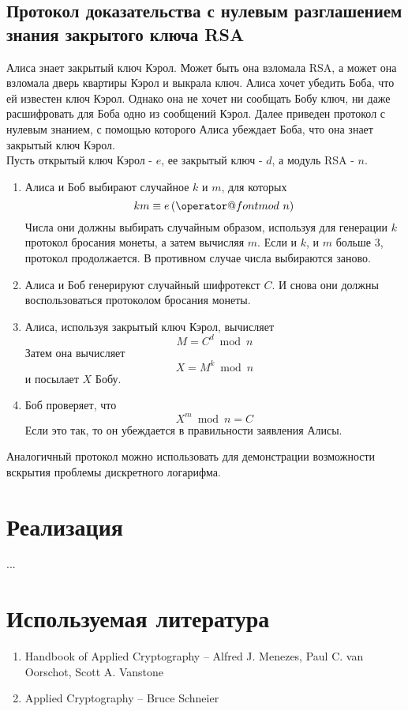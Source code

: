 \documentclass[12pt,a4paper]{report}
\makeatletter
\def\imod#1{\allowbreak\,({\operator@font mod}\ #1)}
\makeatother
\begin{document}
\section{Протокол доказательства с
нулевым разглашением знания закрытого ключа RSA}

Алиса знает закрытый ключ Кэрол. Может быть она взломала RSA, а
может она взломала дверь квартиры Кэрол и выкрала ключ. Алиса
хочет убедить Боба, что ей известен ключ Кэрол. Однако она не
хочет ни сообщать Бобу ключ, ни даже расшифровать для Боба одно
из сообщений Кэрол. Далее приведен протокол с нулевым знанием,
с помощью которого Алиса убеждает Боба, что она знает закрытый
ключ Кэрол.\\

Пусть открытый ключ Кэрол - $e$, ее закрытый ключ - $d$, а
модуль RSA - $n$.

\begin{enumerate}
\item Алиса и Боб выбирают случайное $k$ и $m$, 
для которых $$km \equiv e \imod{n}$$ Числа они 
должны выбирать случайным образом, используя для
генерации $k$ протокол бросания монеты, а затем 
вычисляя $m$. Если и $k$, и $m$ больше $3$,
протокол продолжается. В противном случае числа
выбираются заново.
\item Алиса и Боб генерируют случайный шифротекст
$C$. И снова они должны воспользоваться протоколом
бросания монеты.
\item Алиса, используя закрытый ключ Кэрол, вычисляет
$$M = C^d\bmod{n}$$ Затем она вычисляет 
$$ X = M^k\bmod{n}$$ и посылает $X$ Бобу.
\item Боб проверяет, что $$X^m\bmod{n} = C$$
Если это так, то он убеждается в правильности 
заявления Алисы.
\end{enumerate}

Аналогичный протокол можно использовать для демонстрации
возможности вскрытия проблемы дискретного логарифма.


\chapter{Реализация}

...


\chapter*{Используемая литература}

\begin{enumerate}
\item Handbook of Applied Cryptography -- Alfred J. Menezes, Paul C. van Oorschot, Scott A. Vanstone
\item Applied Cryptography -- Bruce Schneier
\end{enumerate}
\end{document}
